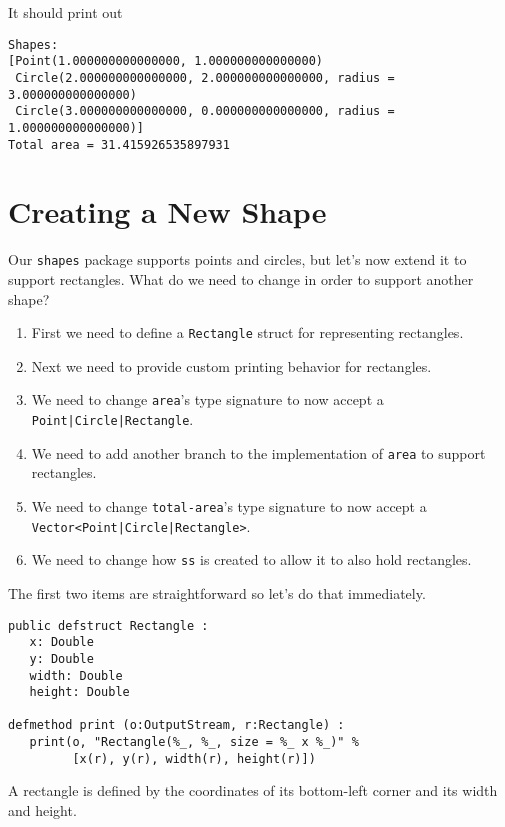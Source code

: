 \documentclass[10pt,oneside]{book}
\begin{document}
It should print out
\begin{lstlisting}
Shapes:
[Point(1.000000000000000, 1.000000000000000)
 Circle(2.000000000000000, 2.000000000000000, radius = 3.000000000000000)
 Circle(3.000000000000000, 0.000000000000000, radius = 1.000000000000000)]
Total area = 31.415926535897931
\end{lstlisting}

\section{Creating a New Shape}
Our \texttt{\frenchspacing shapes} package supports points and circles, but let's now extend it to support rectangles. What do we need to change in order to support another shape?
\begin{enumerate}
\item First we need to define a \texttt{\frenchspacing Rectangle} struct for representing rectangles.
\item Next we need to provide custom printing behavior for rectangles.
\item We need to change \texttt{\frenchspacing area}'s type signature to now accept a \texttt{\frenchspacing Point|Circle|Rectangle}.
\item We need to add another branch to the implementation of \texttt{\frenchspacing area} to support rectangles.
\item We need to change \texttt{\frenchspacing total-area}'s type signature to now accept a \texttt{\frenchspacing Vector<Point|Circle|Rectangle>}.
\item We need to change how \texttt{\frenchspacing ss} is created to allow it to also hold rectangles.
\end{enumerate}

The first two items are straightforward so let's do that immediately.
\begin{lstlisting}
public defstruct Rectangle :
   x: Double
   y: Double
   width: Double
   height: Double

defmethod print (o:OutputStream, r:Rectangle) :
   print(o, "Rectangle(%_, %_, size = %_ x %_)" %
         [x(r), y(r), width(r), height(r)])
\end{lstlisting}
A rectangle is defined by the coordinates of its bottom-left corner and its width and height.
\end{document}

